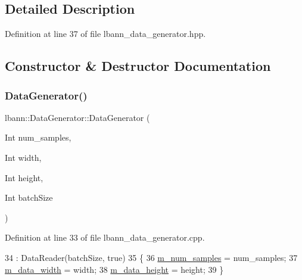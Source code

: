 \subsection{Detailed Description}


Definition at line 37 of file lbann\+\_\+data\+\_\+generator.\+hpp.



\subsection{Constructor \& Destructor Documentation}
\mbox{\label{classlbann_1_1DataGenerator_a66297bbed5baea4bba641e257166370c}} 
\subsubsection{\texorpdfstring{Data\+Generator()}{DataGenerator()}\hspace{0.1cm}{\footnotesize\ttfamily [1/2]}}
{\footnotesize\ttfamily lbann\+::\+Data\+Generator\+::\+Data\+Generator (\begin{DoxyParamCaption}\item[{Int}]{num\+\_\+samples,  }\item[{Int}]{width,  }\item[{Int}]{height,  }\item[{Int}]{batch\+Size }\end{DoxyParamCaption})}



Definition at line 33 of file lbann\+\_\+data\+\_\+generator.\+cpp.


\begin{DoxyCode}
34   : DataReader(batchSize, \textcolor{keyword}{true})
35 \{
36   \hyperlink{classlbann_1_1DataGenerator_a679fdbd459ecefa053b64f78a166c020}{m\_num\_samples} = num\_samples;
37   \hyperlink{classlbann_1_1DataGenerator_a054cb6ab0d93ec57419a81734ddf04aa}{m\_data\_width} = width;
38   \hyperlink{classlbann_1_1DataGenerator_a676e679d18eb0523be714345205c662d}{m\_data\_height} = height;
39 \}
\end{DoxyCode}
\mbox{\label{classlbann_1_1DataGenerator_a43972ae31aa6812519efe7f6e10ef467}} 
